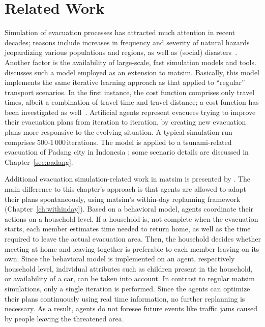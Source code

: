\section{Related Work}
Simulation of evacuation processes has attracted much attention in recent decades; reasons include increases in frequency and severity of natural hazards jeopardizing various populations and regions, as well as (social) disasters~\citep{Rodr2006HBoDisasterResearch}. Another factor is the availability of large-scale, fast simulation models and tools. \citet{Laemmel_PhDThesis_2011} discusses such a model employed as an extension to \gls{matsim}. Basically, this model implements the same iterative learning approach as that applied to ``regular'' transport scenarios. In the first instance, the cost function comprises only travel times, albeit a combination of travel time and travel distance; a cost function has been investigated as well~\citep{00LaemmelKluepfelNagel2009EvacPadangAtBookTimmermanns}. 
Artificial agents represent evacuees trying to improve their evacuation plans from iteration to iteration, by creating new evacuation plans more responsive to the evolving situation. 
A typical simulation run comprises 500-1\,000\,iterations. 
The model is applied to a tsunami-related evacuation of Padang city in Indonesia \citep[e.g.,][]{00TaubenboeckEtAl2012ConcludingLastMilePaperNatHazards,00GosebergEtAl2012LastLastMile}; some scenario details are discussed in Chapter~\ref{sec:padang}. 

Additional evacuation simulation-related work in \gls{matsim} is presented by \citet{Dobler_PhDThesis_2013}. The main difference to this chapter's approach is that agents are allowed to adapt their plans spontaneously, using \gls{matsim}'s within-day replanning framework \citep{DoblerEtAl_TRR_2012} (Chapter~\ref{ch:withinday}). 
Based on a behavioral model, agents coordinate their actions on a household level. If a household is, \eg not complete when the evacuation starts, each member estimates time needed to return home, as well as the time required to leave the actual evacuation area. Then, the household decides whether meeting at home and leaving together is preferable to each member leaving on its own.
Since the behavioral model is implemented on an agent, respectively household level, individual attributes such as children present in the household, or availability of a car, can be taken into account.
In contrast to regular \gls{matsim} simulations, only a single iteration is performed. Since the agents can optimize their plans continuously using real time information, no further replanning is necessary. As a result, agents do not foresee future events like traffic jams caused by people leaving the threatened area.

